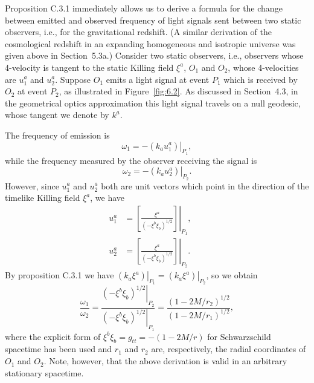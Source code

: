 Proposition C.3.1 immediately allows us to derive a formula for the change between
emitted and observed frequency of light signals sent between two static observers,
i.e., for the gravitational redshift. (A similar derivation of the cosmological
redshift in an expanding homogeneous and isotropic universe was given above in
Section~5.3a.) Consider two static observers, i.e., observers whose 4-velocity is
tangent to the static Killing field \(\xi^a\), \(O_1\) and \(O_2\), whose
4-velocities are \(u_1^a\) and \(u_2^a\). Suppose \(O_1\) emits a light signal at
event \(P_1\) which is received by \(O_2\) at event \(P_2\), as illustrated in
Figure~\ref{fig:6.2}. As discussed in Section~4.3, in the geometrical optics
approximation this light signal travels on a null geodesic, whose tangent we
denote by \(k^a\).

The frequency of emission is
\begin{equation}
  \omega_1=-\left.(k_au_1^a)\right|_{P_1},
  \tag{6.3.1}\label{eq:6.3.1}
\end{equation}
while the frequency measured by the observer receiving the signal is
\begin{equation}
  \omega_2=-\left.(k_au_2^a)\right|_{P_2}.
  \tag{6.3.2}\label{eq:6.3.2}
\end{equation}
However, since \(u_1^a\) and \(u_2^a\) both are unit vectors which point in the
direction of the timelike Killing field \(\xi^a\), we have
\begin{align}
  u_1^a&=\left.\left[\frac{\xi^a}{(-\xi^b\xi_b)^{1/2}}\right]\right|_{P_1},
  &&\tag{6.3.3}\label{eq:6.3.3}\\
  u_2^a&=\left.\left[\frac{\xi^a}{(-\xi^b\xi_b)^{1/2}}\right]\right|_{P_2}.
  &&\tag{6.3.4}\label{eq:6.3.4}
\end{align}
By proposition C.3.1 we have
\(\left.(k_a\xi^a)\right|_{P_1}=\left.(k_a\xi^a)\right|_{P_2}\), so we obtain
\begin{equation}
  \frac{\omega_1}{\omega_2}
  =\frac{\left.(-\xi^b\xi_b)^{1/2}\right|_{P_2}}
         {\left.(-\xi^b\xi_b)^{1/2}\right|_{P_1}}
  =\frac{(1-2M/r_2)^{1/2}}{(1-2M/r_1)^{1/2}},
  \tag{6.3.5}\label{eq:6.3.5}
\end{equation}
where the explicit form of \(\xi^b\xi_b=g_{tt}=-(1-2M/r)\) for Schwarzschild
spacetime has been used and \(r_1\) and \(r_2\) are, respectively, the radial
coordinates of \(O_1\) and \(O_2\). Note, however, that the above derivation is
valid in an arbitrary stationary spacetime.

